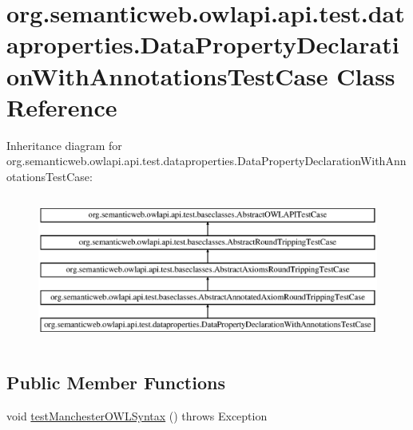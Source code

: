 \hypertarget{classorg_1_1semanticweb_1_1owlapi_1_1api_1_1test_1_1dataproperties_1_1_data_property_declaration_with_annotations_test_case}{\section{org.\-semanticweb.\-owlapi.\-api.\-test.\-dataproperties.\-Data\-Property\-Declaration\-With\-Annotations\-Test\-Case Class Reference}
\label{classorg_1_1semanticweb_1_1owlapi_1_1api_1_1test_1_1dataproperties_1_1_data_property_declaration_with_annotations_test_case}
}
Inheritance diagram for org.\-semanticweb.\-owlapi.\-api.\-test.\-dataproperties.\-Data\-Property\-Declaration\-With\-Annotations\-Test\-Case\-:\begin{figure}[H]
\begin{center}
\leavevmode
\includegraphics[height=4.912281cm]{classorg_1_1semanticweb_1_1owlapi_1_1api_1_1test_1_1dataproperties_1_1_data_property_declaration_with_annotations_test_case}
\end{center}
\end{figure}
\subsection*{Public Member Functions}
\begin{DoxyCompactItemize}
\item 
void \hyperlink{classorg_1_1semanticweb_1_1owlapi_1_1api_1_1test_1_1dataproperties_1_1_data_property_declaration_with_annotations_test_case_ab4da3787989101a9ccfbe4a58c11e52a}{test\-Manchester\-O\-W\-L\-Syntax} ()  throws Exception 
\end{DoxyCompactItemize}
